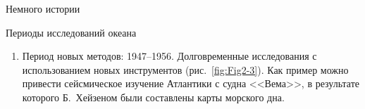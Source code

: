 \begin{chapter}{Немного истории}
\begin{section}{Периоды исследований океана}
\begin{enumerate}
\begin{figure}[t!]
\caption{Пример экспедиции периода национальных систематических исследований.
Путь НИС <<Метеор>> (Германия) Wust (1964).}
\label{fig:Fig2-2}
\end{figure}
%
% 

\item
Период новых методов: 1947--1956. Долговременные
исследования с использованием новых инструментов (рис.~\ref{fig:Fig2-3}). Как
пример можно привести сейсмическое изучение Атлантики с судна <<Вема>>, в
результате которого Б.~Хейзеном были составлены карты морского дна.
%


\end{enumerate}
\end{section}
\end{chapter}
